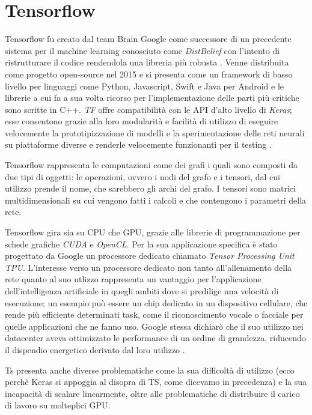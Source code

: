 \section{Tensorflow}
Tensorflow  fu creato dal team Brain Google come successore di un precedente sistema per il machine learning conosciuto come \textit{DistBelief} con l'intento di ristrutturare il codice rendendola una libreria più robusta \cite{wiki:tf}. Venne distribuita come progetto open-source nel 2015 e si presenta come un framework di basso livello \cite{oreilly:pytorch_intro} per linguaggi come Python, Javascript, Swift e Java per Android  e le librerie a cui fa a sua volta ricorso per l'implementazione delle parti più critiche sono scritte in C++. \textit{TF} offre compatibilità con le API d'alto livello di \textit{Keras}; esse consentono grazie alla loro modularità e facilità di utilizzo di eseguire velocemente la prototipizzazione di modelli e la sperimentazione delle reti neurali su piattaforme diverse e renderle velocemente funzionanti per il testing \cite{keras}.

Tensorflow rappresenta le computazioni come dei grafi i quali sono composti da due tipi di oggetti: le operazioni, ovvero i nodi del grafo e i tensori, dal cui utilizzo prende il nome, che sarebbero gli archi del grafo.
I tensori sono matrici multidimensionali su cui vengono fatti i calcoli e che contengono i parametri della rete.

Tensorflow gira sia su CPU che GPU, grazie alle librerie di programmazione per schede grafiche \textit{CUDA} e \textit{OpenCL}. Per la sua applicazione specifica è stato progettato da Google un processore dedicato chiamato \emph{Tensor Processing Unit} \textit{TPU}. L'interesse verso un processore dedicato non tanto all'allenamento della rete quanto al suo utlizzo rappresenta un vantaggio per l'applicazione dell'intelligenza artificiale in quegli ambiti dove si predilige una velocità di esecuzione; un esempio può essere un chip dedicato in un dispositivo cellulare, che rende più efficiente determinati task, come il riconoscimento vocale o facciale per quelle applicazioni che ne fanno uso. Google stessa dichiarò che il suo utilizzo nei datacenter aveva ottimizzato le performance di un ordine di grandezza, riducendo il dispendio energetico derivato dal loro utilizzo \cite{gao2014machine}. 

Ts presenta anche diverse problematiche come la sua difficoltà di utilizzo (ecco perchè Keras si appoggia al disopra di TS, come dicevamo in precedenza) e la sua incapacità di scalare linearmente, oltre alle problematiche di distribuire il carico di lavoro su molteplici GPU\cite{quora:mxnet}.

